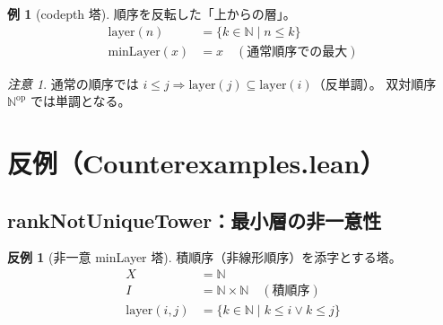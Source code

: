 \documentclass[a4paper,11pt]{ltjsarticle}
\theoremstyle{definition}
\newtheorem{example}[definition]{例}
\newtheorem{counterexample}[definition]{反例}
\theoremstyle{plain}
\theoremstyle{remark}
\newtheorem{remark}[definition]{注意}
\newcommand{\N}{\mathbb{N}}
\newcommand{\Layer}{\mathrm{layer}}
\newcommand{\minLayer}{\mathrm{minLayer}}
\begin{document}
\begin{example}[codepth 塔]
順序を反転した「上からの層」。
\begin{align*}
    \Layer(n) &= \{k \in \N \mid n \leq k\} \\
    \minLayer(x) &= x \quad (\text{通常順序での最大})
\end{align*}
\end{example}

\begin{remark}
通常の順序では $i \leq j \Rightarrow \Layer(j) \subseteq \Layer(i)$（反単調）。
双対順序 $\N^{\mathrm{op}}$ では単調となる。
\end{remark}

\section{反例（Counterexamples.lean）}

\subsection{rankNotUniqueTower：最小層の非一意性}

\begin{counterexample}[非一意 minLayer 塔]
積順序（非線形順序）を添字とする塔。
\begin{align*}
    X &= \N \\
    I &= \N \times \N \quad (\text{積順序}) \\
    \Layer(i, j) &= \{k \in \N \mid k \leq i \lor k \leq j\}
\end{align*}
\end{counterexample}
\end{document}
